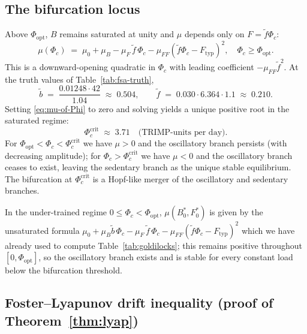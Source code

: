 \subsection{The bifurcation locus}\label{app:lyap-bifurcation}

Above $\Phi_{\mathrm{opt}}$, $B$ remains saturated at unity and
$\mu$ depends only on $F = \tilde f \Phi_c$:
\begin{equation}
  \mu(\Phi_c) \;=\; \mu_0 + \mu_B - \mu_F\,\tilde f\,\Phi_c - \mu_{FF}(\tilde f\Phi_c - F_{\mathrm{typ}})^2,
  \quad \Phi_c \ge \Phi_{\mathrm{opt}}.
  \label{eq:mu-of-Phi}
\end{equation}
This is a downward-opening quadratic in $\Phi_c$ with leading
coefficient $-\mu_{FF}\tilde f^2$. At the truth values of
Table~\ref{tab:fsa-truth},
\begin{equation*}
  \tilde b \;=\; \frac{0.01248 \cdot 42}{1.04} \;\approx\; 0.504,
  \qquad
  \tilde f \;=\; 0.030 \cdot 6.364 \cdot 1.1 \;\approx\; 0.210.
\end{equation*}
Setting \eqref{eq:mu-of-Phi} to zero and solving yields a unique
positive root in the saturated regime:
\begin{equation}
  \Phi_c^{\mathrm{crit}} \;\approx\; 3.71\quad\text{(TRIMP-units per day)}.
\end{equation}
For $\Phi_{\mathrm{opt}} < \Phi_c < \Phi_c^{\mathrm{crit}}$ we have
$\mu > 0$ and the oscillatory branch persists (with decreasing
amplitude); for $\Phi_c > \Phi_c^{\mathrm{crit}}$ we have $\mu < 0$
and the oscillatory branch ceases to exist, leaving the sedentary
branch as the unique stable equilibrium. The bifurcation at
$\Phi_c^{\mathrm{crit}}$ is a Hopf-like merger of the oscillatory
and sedentary branches.

In the under-trained regime $0 \le \Phi_c < \Phi_{\mathrm{opt}}$,
$\mu(B^*_0,F^*_0)$ is given by the unsaturated formula
$\mu_0 + \mu_B \tilde b\,\Phi_c - \mu_F\,\tilde f\,\Phi_c
       - \mu_{FF}(\tilde f\Phi_c - F_{\mathrm{typ}})^2$
which we have already used to compute
Table~\ref{tab:goldilocks}; this remains positive throughout
$[0,\Phi_{\mathrm{opt}}]$, so the oscillatory branch exists and is
stable for every constant load below the bifurcation threshold.

\subsection{Foster--Lyapunov drift inequality (proof of Theorem~\ref{thm:lyap})}\label{app:lyap-foster}


